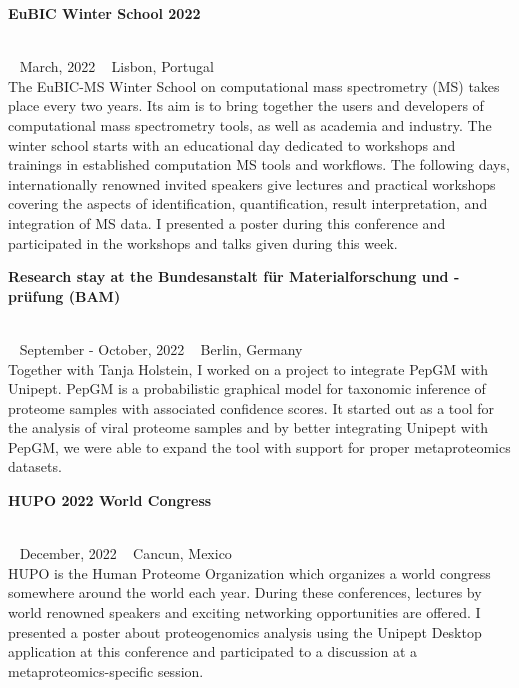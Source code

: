 \pagebreak

\begin{large}\textbf{\textsf{EuBIC Winter School 2022}}\end{large} \\
\faCalendar ~ \textsf{March, 2022} \hfill \faGlobe ~ \textsf{Lisbon, Portugal} \\
The EuBIC-MS Winter School on computational mass spectrometry (MS) takes place every two years.
Its aim is to bring together the users and developers of computational mass spectrometry tools, as well as academia and industry.
The winter school starts with an educational day dedicated to workshops and trainings in established computation MS tools and workflows.
The following days, internationally renowned invited speakers give lectures and practical workshops covering the aspects of identification, quantification, result interpretation, and integration of MS data.
I presented a poster during this conference and participated in the workshops and talks given during this week.

\begin{large}\textbf{\textsf{Research stay at the Bundesanstalt für Materialforschung und -prüfung (BAM)}}\end{large} \\
\faCalendar ~ \textsf{September - October, 2022} \hfill \faGlobe ~ \textsf{Berlin, Germany} \\
Together with Tanja Holstein, I worked on a project to integrate PepGM with Unipept.
PepGM is a probabilistic graphical model for taxonomic inference of proteome samples with associated confidence scores.
It started out as a tool for the analysis of viral proteome samples and by better integrating Unipept with PepGM, we were able to expand the tool with support for proper metaproteomics datasets.

\begin{large}\textbf{\textsf{HUPO 2022 World Congress}}\end{large} \\
\faCalendar ~ \textsf{December, 2022} \hfill \faGlobe ~ \textsf{Cancun, Mexico} \\
HUPO is the Human Proteome Organization which organizes a world congress somewhere around the world each year.
During these conferences, lectures by world renowned speakers and exciting networking opportunities are offered.
I presented a poster about proteogenomics analysis using the Unipept Desktop application at this conference and participated to a discussion at a metaproteomics-specific session.

